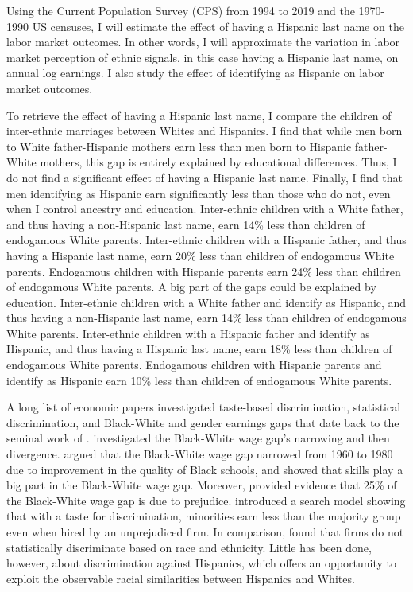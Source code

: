 \documentclass{wptemp}
\begin{document}
Using the Current Population Survey (CPS) from 1994 to 2019 and the 1970-1990 US censuses, I will estimate the effect of having a Hispanic last name on the labor market outcomes. In other words, I will approximate the variation in labor market perception of ethnic signals, in this case having a Hispanic last name, on annual log earnings. I also study the effect of identifying as Hispanic on labor market outcomes. 

To retrieve the effect of having a Hispanic last name, I compare the children of inter-ethnic marriages between Whites and Hispanics. I find that while men born to White father-Hispanic mothers earn less than men born to Hispanic father-White mothers, this gap is entirely explained by educational differences. Thus, I do not find a significant effect of having a Hispanic last name. Finally, I find that men identifying as Hispanic earn significantly less than those who do not, even when I control ancestry and education. Inter-ethnic children with a White father, and thus having a non-Hispanic last name, earn 14\% less than children of endogamous White parents. Inter-ethnic children with a Hispanic father, and thus having a Hispanic last name, earn 20\% less than children of endogamous White parents. Endogamous children with Hispanic parents earn 24\% less than children of endogamous White parents. A big part of the gaps could be explained by education. Inter-ethnic children with a White father and identify as Hispanic, and thus having a non-Hispanic last name, earn 14\% less than children of endogamous White parents. Inter-ethnic children with a Hispanic father and identify as Hispanic, and thus having a Hispanic last name, earn 18\% less than children of endogamous White parents. Endogamous children with Hispanic parents and identify as Hispanic earn 10\% less than children of endogamous White parents.

A long list of economic papers investigated taste-based discrimination, statistical discrimination, and Black-White and gender earnings gaps that date back to the seminal work of \citet{becker2010economics}. \citet{bayer2018divergent} investigated the Black-White wage gap's narrowing and then divergence. \citet{card1992school} argued that the Black-White wage gap narrowed from 1960 to 1980 due to improvement in the quality of Black schools, and \citet{juhn1991accounting} showed that skills play a big part in the Black-White wage gap. Moreover,  \citet{charles2008prejudice} provided evidence that 25\% of the Black-White wage gap is due to prejudice. \citet{black1995discrimination} introduced a search model showing that with a taste for discrimination, minorities earn less than the majority group even when hired by an unprejudiced firm. In comparison, \citet{altonji2001employer} found that firms do not statistically discriminate based on race and ethnicity. Little has been done, however, about discrimination against Hispanics, which offers an opportunity to exploit the observable racial similarities between Hispanics and Whites.
\end{document}
